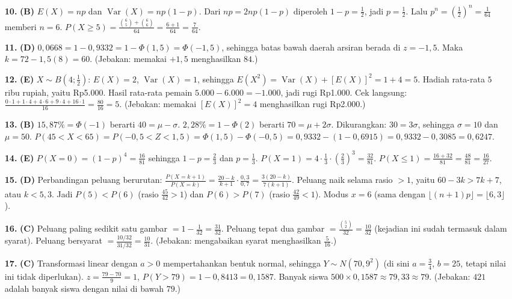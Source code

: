 \documentclass[a4paper,11pt]{article}
\newcounter{no}
\newcommand{\Var}{\operatorname{Var}}
\begin{document}
\begin{enumerate}[leftmargin=2em,itemsep=2pt,topsep=2pt]
\item[\textbf{10.}] \textbf{(B)} $E(X)=np$ dan $\Var(X)=np(1-p)$. Dari $np=2np(1-p)$ diperoleh $1-p=\frac12$, jadi $p=\frac12$. Lalu $p^n=\left(\frac12\right)^n=\frac1{64}$ memberi $n=6$. $P(X\ge5)=\frac{\binom65+\binom66}{64}=\frac{6+1}{64}=\frac7{64}$.
\item[\textbf{11.}] \textbf{(D)} $0{,}0668=1-0{,}9332=1-\Phi(1{,}5)=\Phi(-1{,}5)$, sehingga batas bawah daerah arsiran berada di $z=-1{,}5$. Maka $k=72-1{,}5(8)=60$. (Jebakan: memakai $+1{,}5$ menghasilkan $84$.)
\item[\textbf{12.}] \textbf{(E)} $X\sim B(4;\frac12)$: $E(X)=2$, $\Var(X)=1$, sehingga $E(X^2)=\Var(X)+[E(X)]^2=1+4=5$. Hadiah rata-rata $5$ ribu rupiah, yaitu Rp5.000. Hasil rata-rata pemain $5.000-6.000=-1.000$, jadi rugi Rp1.000. Cek langsung: $\frac{0\cdot1+1\cdot4+4\cdot6+9\cdot4+16\cdot1}{16}=\frac{80}{16}=5$. (Jebakan: memakai $[E(X)]^2=4$ menghasilkan rugi Rp2.000.)
\item[\textbf{13.}] \textbf{(B)} $15{,}87\%=\Phi(-1)$ berarti $40=\mu-\sigma$. $2{,}28\%=1-\Phi(2)$ berarti $70=\mu+2\sigma$. Dikurangkan: $30=3\sigma$, sehingga $\sigma=10$ dan $\mu=50$. $P(45<X<65)=P(-0{,}5<Z<1{,}5)=\Phi(1{,}5)-\Phi(-0{,}5)=0{,}9332-(1-0{,}6915)=0{,}9332-0{,}3085=0{,}6247$.
\item[\textbf{14.}] \textbf{(E)} $P(X=0)=(1-p)^4=\frac{16}{81}$ sehingga $1-p=\frac23$ dan $p=\frac13$. $P(X=1)=4\cdot\frac13\cdot\left(\frac23\right)^3=\frac{32}{81}$. $P(X\le1)=\frac{16+32}{81}=\frac{48}{81}=\frac{16}{27}$.
\item[\textbf{15.}] \textbf{(D)} Perbandingan peluang berurutan: $\frac{P(X=k+1)}{P(X=k)}=\frac{20-k}{k+1}\cdot\frac{0{,}3}{0{,}7}=\frac{3(20-k)}{7(k+1)}$. Peluang naik selama rasio $>1$, yaitu $60-3k>7k+7$, atau $k<5{,}3$. Jadi $P(5)<P(6)$ (rasio $\frac{45}{42}>1$) dan $P(6)>P(7)$ (rasio $\frac{42}{49}<1$). Modus $x=6$ (sama dengan $\lfloor(n+1)p\rfloor=\lfloor6{,}3\rfloor$).
\item[\textbf{16.}] \textbf{(C)} Peluang paling sedikit satu gambar $=1-\frac1{32}=\frac{31}{32}$. Peluang tepat dua gambar $=\frac{\binom52}{32}=\frac{10}{32}$ (kejadian ini sudah termasuk dalam syarat). Peluang bersyarat $=\frac{10/32}{31/32}=\frac{10}{31}$. (Jebakan: mengabaikan syarat menghasilkan $\frac5{16}$.)
\item[\textbf{17.}] \textbf{(C)} Transformasi linear dengan $a>0$ mempertahankan bentuk normal, sehingga $Y\sim N(70,9^2)$ (di sini $a=\frac34$, $b=25$, tetapi nilai ini tidak diperlukan). $z=\frac{79-70}{9}=1$, $P(Y>79)=1-0{,}8413=0{,}1587$. Banyak siswa $500\times0{,}1587\approx79{,}33\approx79$. (Jebakan: $421$ adalah banyak siswa dengan nilai di bawah $79$.)

\end{enumerate}
\end{document}
